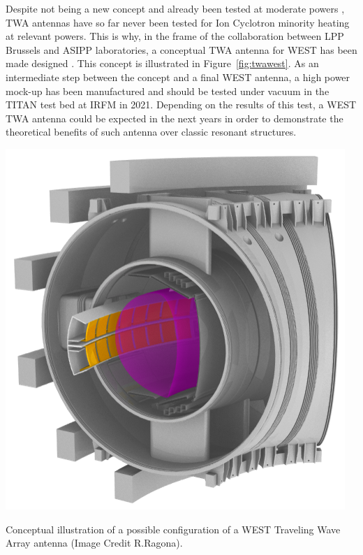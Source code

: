 {Despite not being a new concept  and already been tested at moderate powers , TWA antennas have so far never been tested for Ion Cyclotron minority heating at relevant powers. This is why, in the frame of the collaboration between LPP Brussels and ASIPP laboratories, a conceptual TWA antenna for WEST has been made designed . This concept is illustrated in Figure~\ref{fig:twawest}. As an intermediate step between the concept and a final WEST antenna, a high power mock-up has been manufactured and should be tested under vacuum in the TITAN test bed at IRFM in 2021. Depending on the results of this test, a WEST TWA antenna could be expected in the next years in order to demonstrate the theoretical benefits of such antenna over classic resonant structures.

\begin{marginfigure}
	\centering
	
	\includegraphics[width=1.0\linewidth]{figures/chap3/TWA/TWA_WEST}
	\caption{Conceptual illustration of a possible configuration of a WEST Traveling Wave Array antenna (Image Credit R.Ragona).}
	\label{fig:twawest}
\end{marginfigure}



}
